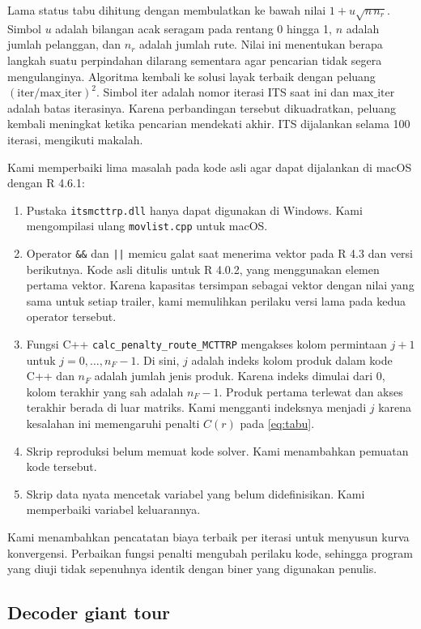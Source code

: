 \documentclass[conference]{IEEEtran}
\begin{document}
Lama status tabu dihitung dengan membulatkan ke bawah nilai $1+u\sqrt{n\,n_r}$. Simbol $u$ adalah bilangan acak seragam pada rentang 0 hingga 1, $n$ adalah jumlah pelanggan, dan $n_r$ adalah jumlah rute. Nilai ini menentukan berapa langkah suatu perpindahan dilarang sementara agar pencarian tidak segera mengulanginya. Algoritma kembali ke solusi layak terbaik dengan peluang $(\text{iter}/\text{max\_iter})^2$. Simbol $\text{iter}$ adalah nomor iterasi ITS saat ini dan $\text{max\_iter}$ adalah batas iterasinya. Karena perbandingan tersebut dikuadratkan, peluang kembali meningkat ketika pencarian mendekati akhir. ITS dijalankan selama 100 iterasi, mengikuti makalah.

Kami memperbaiki lima masalah pada kode asli agar dapat dijalankan di macOS dengan R 4.6.1:
\begin{enumerate}
\item Pustaka \texttt{itsmcttrp.dll} hanya dapat digunakan di Windows. Kami mengompilasi ulang \texttt{movlist.cpp} untuk macOS.
\item Operator \texttt{\&\&} dan \texttt{||} memicu galat saat menerima vektor pada R 4.3 dan versi berikutnya. Kode asli ditulis untuk R 4.0.2, yang menggunakan elemen pertama vektor. Karena kapasitas tersimpan sebagai vektor dengan nilai yang sama untuk setiap trailer, kami memulihkan perilaku versi lama pada kedua operator tersebut.
\item Fungsi C++ \texttt{calc\_penalty\_route\_MCTTRP} mengakses kolom permintaan $j+1$ untuk $j=0,\dots,n_F-1$. Di sini, $j$ adalah indeks kolom produk dalam kode C++ dan $n_F$ adalah jumlah jenis produk. Karena indeks dimulai dari 0, kolom terakhir yang sah adalah $n_F-1$. Produk pertama terlewat dan akses terakhir berada di luar matriks. Kami mengganti indeksnya menjadi $j$ karena kesalahan ini memengaruhi penalti $C(r)$ pada \eqref{eq:tabu}.
\item Skrip reproduksi belum memuat kode solver. Kami menambahkan pemuatan kode tersebut.
\item Skrip data nyata mencetak variabel yang belum didefinisikan. Kami memperbaiki variabel keluarannya.
\end{enumerate}
Kami menambahkan pencatatan biaya terbaik per iterasi untuk menyusun kurva konvergensi. Perbaikan fungsi penalti mengubah perilaku kode, sehingga program yang diuji tidak sepenuhnya identik dengan biner yang digunakan penulis.

\subsection{Decoder giant tour}\label{sec:decoder}
\end{document}
